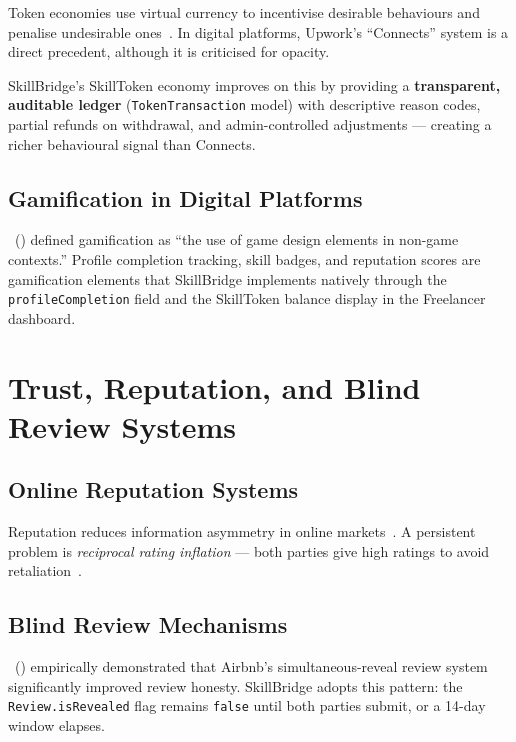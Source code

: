 Token economies use virtual currency to incentivise desirable behaviours and penalise
undesirable ones~\citep{Skinner1938}. In digital platforms, Upwork's ``Connects'' system
is a direct precedent, although it is criticised for opacity.

SkillBridge's SkillToken economy improves on this by providing a \textbf{transparent,
auditable ledger} (\texttt{TokenTransaction} model) with descriptive reason codes, partial
refunds on withdrawal, and admin-controlled adjustments — creating a richer behavioural
signal than Connects.

\subsection{Gamification in Digital Platforms}

\citeauthor{Deterding2011}~(\citeyear{Deterding2011}) defined gamification as ``the use of
game design elements in non-game contexts.'' Profile completion tracking, skill badges, and
reputation scores are gamification elements that SkillBridge implements natively through the
\texttt{profileCompletion} field and the SkillToken balance display in the Freelancer
dashboard.

\section{Trust, Reputation, and Blind Review Systems}

\subsection{Online Reputation Systems}

Reputation reduces information asymmetry in online markets~\citep{Resnick2000,
DellarocasStar2003}. A persistent problem is \textit{reciprocal rating inflation} — both
parties give high ratings to avoid retaliation~\citep{Fradkin2015}.

\subsection{Blind Review Mechanisms}

\citeauthor{Fradkin2015}~(\citeyear{Fradkin2015}) empirically demonstrated that Airbnb's
simultaneous-reveal review system significantly improved review honesty. SkillBridge adopts
this pattern: the \texttt{Review.isRevealed} flag remains \texttt{false} until both parties
submit, or a 14-day window elapses.

